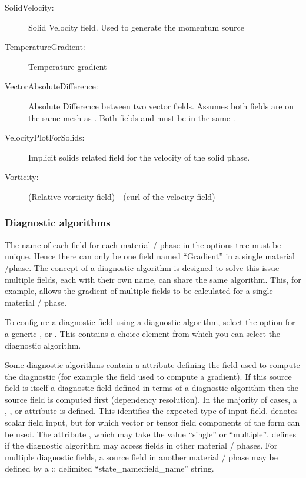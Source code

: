 \begin{description}
 \item[SolidVelocity:]Solid Velocity field.  Used to generate the momentum source   
 \item[TemperatureGradient:]Temperature gradient
 \item[VectorAbsoluteDifference:]Absolute Difference between two vector fields. Assumes both fields are on the same mesh as . Both fields and  must be in the same .    
 \item[VelocityPlotForSolids:]Implicit solids related field for the velocity of the solid phase.
 \item[Vorticity:](Relative vorticity field) - (curl of the velocity field)    
\end{description}


\subsubsection{Diagnostic algorithms}\label{sec:diagnostic_algorithms}

The name of each field for each material / phase  in the options tree must be
unique. Hence there can only be one field named ``Gradient'' in a single
material /phase. The concept of a diagnostic algorithm is designed to solve this
issue - multiple fields, each with their own name, can share the same algorithm.
This, for example, allows the gradient of multiple fields to be calculated for a
single material / phase.

To configure a diagnostic field using a diagnostic algorithm, select the
 option for a generic , 
or . This contains a 
choice element from which you can select the diagnostic algorithm.

Some diagnostic algorithms contain a 
attribute defining the field used to compute the diagnostic (for example the
field used to compute a gradient). If this source field is itself a diagnostic
field defined in terms of a diagnostic algorithm then the source field is
computed first (dependency resolution).
In the majority of cases, a , , 
or  attribute is defined. This identifies the
expected type of input field.  denotes scalar field
input, but for which vector or tensor field components of the form 
can be used.
The attribute , which may take the
value ``single'' or ``multiple'', defines if the diagnostic algorithm may
access fields in other material / phases. For multiple 
diagnostic fields, a source field in another material / phase
may be defined by a :: delimited ``state\_name\::field\_name'' string.

